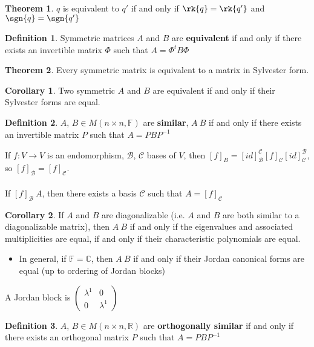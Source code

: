 \documentclass[letterpaper,12pt]{article}
\theoremstyle{definition}
\newtheorem*{definition}{Definition}
\newtheorem*{theorem}{Theorem}
\newtheorem*{corollary}{Corollary}
\begin{document}
\begin{theorem}
$q$ is equivalent to $q'$ if and only if $\rk{q} = \rk{q'}$ and $\sgn{q} = \sgn{q'}$
\end{theorem}
\begin{definition}
Symmetric matrices $A$ and $B$ are \textbf{equivalent} if and only if there exists an invertible matrix $\Phi$ such that $A = \Phi^{t}B \Phi$
\end{definition}
\begin{theorem}
Every symmetric matrix is equivalent to a matrix in Sylvester form.
\end{theorem}

\begin{corollary}
Two symmetric $A$ and $B$ are equivalent if and only if their Sylvester forms are equal.
\end{corollary}

\begin{definition}
$A$, $B \in M(n \times n, \mathbb{F})$ are \textbf{similar}, $A ~ B$ if and only if there exists an invertible matrix $P$ such that $A = PBP^{-1}$
\end{definition}

If $f: V \rightarrow V$ is an endomorphism, $\mathcal{B}$, $\mathcal{C}$ bases of $V$, then $[f]_{B} = [id]_{\mathcal{B}}^{\mathcal{C}} [f]_{\mathcal{C}} [id]_{\mathcal{C}}^{\mathcal{B}}$, so $[f]_{\mathcal{B}} = [f]_{\mathcal{C}}$.
\\ \\ If $[f]_{\mathcal{B}} ~ A$, then there exists a basis $\mathcal{C}$ such that $A = [f]_{\mathcal{C}}$

\begin{corollary}
If $A$ and $B$ are diagonalizable (i.e. $A$ and $B$ are both similar to a diagonalizable matrix), then $A ~ B$ if and only if the eigenvalues and associated multiplicities are equal, if and only if their characteristic polynomials are equal.
\begin{itemize}
    \item In general, if $\mathbb{F} = \mathbb{C}$, then $A ~ B$ if and only if their Jordan canonical forms are equal (up to ordering of Jordan blocks)
\end{itemize}
\end{corollary}

A Jordan block is $\begin{pmatrix} \lambda^1 & 0 \\ 0 & \lambda^1 \end{pmatrix}$
\begin{definition}
$A$, $B \in M(n \times n, \mathbb{R})$ are \textbf{orthogonally similar} if and only if there exists an orthogonal matrix $P$ such that $A = PBP^{-1}$
\end{definition}
\end{document}
